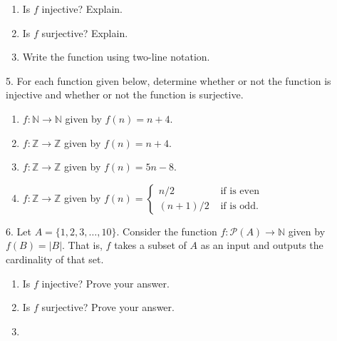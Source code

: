 \documentclass[10pt,]{book}
\theoremstyle{plain}
\theoremstyle{definition}
\theoremstyle{definition}
\theoremstyle{definition}
\numberwithin{equation}{chapter}
\def\N{\mathbb N}
\def\Z{\mathbb Z}
\def\pow{\mathcal P}
\newcommand{\amp}{ & }
\begin{document}
\begin{exerciselist}
\begin{figure}
{
}
\end{figure}
\leavevmode%
\begin{enumerate}[label=(\alph*)]
\item\hypertarget{li-307}{}
                Is \(f\) injective? Explain.
\item\hypertarget{li-308}{}
                Is \(f\) surjective? Explain.
\item\hypertarget{li-309}{}
                Write the function using two-line notation.
\end{enumerate}
\par\smallskip
\item[5.]\hypertarget{exercise-31}{}
            For each function given below, determine whether or not the function is injective and whether or not the function is surjective.
\leavevmode%
\begin{enumerate}[label=(\alph*)]
\item\hypertarget{li-313}{}\(f:\N \to \N\) given by \(f(n) = n+4\).%
\item\hypertarget{li-314}{}\(f:\Z \to \Z\) given by \(f(n) = n+4\).%
\item\hypertarget{li-315}{}\(f:\Z \to \Z\) given by \(f(n) = 5n - 8\).%
\item\hypertarget{li-316}{}\(f:\Z \to \Z\) given by \(f(n) = \begin{cases}n/2 \amp  \mbox{ if  is even} \\ (n+1)/2 \amp \mbox{ if  is odd} . \end{cases}
              \)%
\end{enumerate}
\par\smallskip
\item[6.]\hypertarget{exercise-32}{}
            Let \(A = \{1,2,3,\ldots,10\}\). Consider the function \(f:\pow(A) \to \N\) given by \(f(B) = |B|\). That is, \(f\) takes a subset of \(A\) as an input and outputs the cardinality of that set.
\leavevmode%
\begin{enumerate}[label=(\alph*)]
\item\hypertarget{li-321}{}
                Is \(f\) injective? Prove your answer.
\item\hypertarget{li-322}{}
                Is \(f\) surjective? Prove your answer.
\item\hypertarget{li-323}{}

\end{enumerate}
\end{exerciselist}
\end{document}
